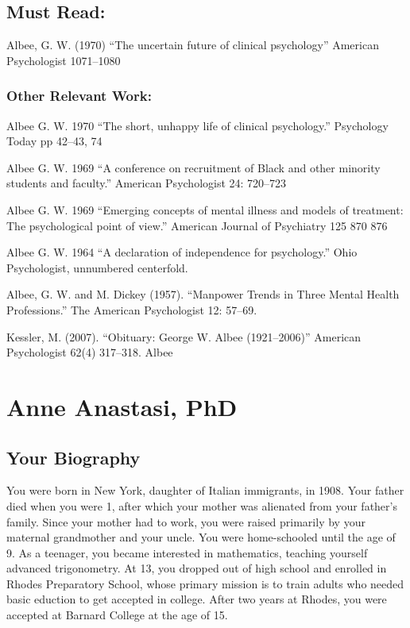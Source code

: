 \begin{refsection}
\section{Must Read:}
\label{mustread:}

Albee, G. W. (1970) ``The uncertain future of clinical psychology'' American Psychologist 1071--1080

\subsection{Other Relevant Work:}
\label{otherrelevantwork:}

Albee G. W. 1970 ``The short, unhappy life of clinical psychology.'' Psychology Today pp 42--43, 74

Albee G. W. 1969 ``A conference on recruitment of Black and other minority students and faculty.'' American Psychologist 24: 720--723

Albee G. W. 1969 ``Emerging concepts of mental illness and models of treatment: The psychological point of view.'' American Journal of Psychiatry 125 870 876

Albee G. W. 1964 ``A declaration of independence for psychology.'' Ohio Psychologist, unnumbered centerfold.

Albee, G. W. and M. Dickey (1957). ``Manpower Trends in Three Mental Health Professions.'' The American Psychologist 12: 57--69.

Kessler, M. (2007). ``Obituary: George W. Albee (1921--2006)'' American Psychologist 62(4) 317--318.
Albee

\chapter{Anne Anastasi, PhD}
\label{anneanastasiphd}

\section{Your Biography}
\label{yourbiography}

You were born in New York, daughter of Italian immigrants, in 1908. Your father died when you were 1, after which your mother was alienated from your father's family. Since your mother had to work, you were raised primarily by your maternal grandmother and your uncle. You were home-schooled until the age of 9. As a teenager, you became interested in mathematics, teaching yourself advanced trigonometry. At 13, you dropped out of high school and enrolled in Rhodes Preparatory School, whose primary mission is to train adults who needed basic eduction to get accepted in college. After two years at Rhodes, you were accepted at Barnard College at the age of 15.


\end{refsection}
